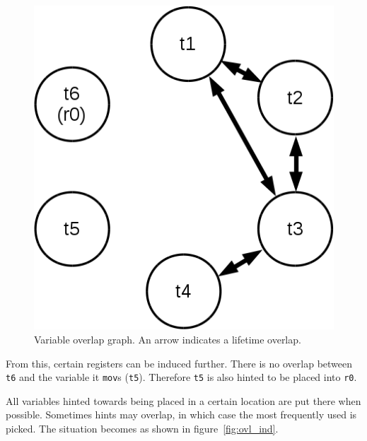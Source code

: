 \documentclass[12pt, a4paper]{article}
\begin{document}
\begin{figure}[h]
\begin{center}
\includegraphics[scale=0.3]{ovldump.png}
\caption{Variable overlap graph. An arrow indicates a lifetime overlap.}
\label{fig:ovl}
\end{center}
\end{figure}

From this, certain registers can be induced further. There is no overlap
between \verb+t6+ and the variable it \verb+mov+s (\verb+t5+). Therefore
\verb+t5+ is also hinted to be placed into \verb+r0+.

All variables hinted towards being placed in a certain location are put there
when possible. Sometimes hints may overlap, in which case the most frequently
used is picked. The situation becomes as shown in figure~\ref{fig:ovl_ind}.
\end{document}

